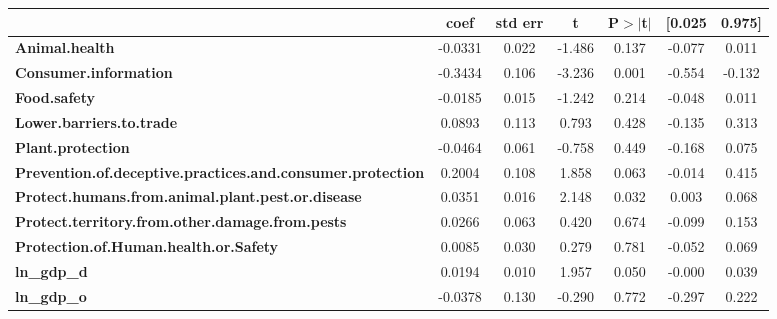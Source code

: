 \begin{center}
\begin{tabular}{lcccccc}
                                                                   & \textbf{coef} & \textbf{std err} & \textbf{t} & \textbf{P$> |$t$|$} & \textbf{[0.025} & \textbf{0.975]}  \\
\midrule
\textbf{Animal.health}                                             &      -0.0331  &        0.022     &    -1.486  &         0.137        &       -0.077    &        0.011     \\
\textbf{Consumer.information}                                      &      -0.3434  &        0.106     &    -3.236  &         0.001        &       -0.554    &       -0.132     \\
\textbf{Food.safety}                                               &      -0.0185  &        0.015     &    -1.242  &         0.214        &       -0.048    &        0.011     \\
\textbf{Lower.barriers.to.trade}                                   &       0.0893  &        0.113     &     0.793  &         0.428        &       -0.135    &        0.313     \\
\textbf{Plant.protection}                                          &      -0.0464  &        0.061     &    -0.758  &         0.449        &       -0.168    &        0.075     \\
\textbf{Prevention.of.deceptive.practices.and.consumer.protection} &       0.2004  &        0.108     &     1.858  &         0.063        &       -0.014    &        0.415     \\
\textbf{Protect.humans.from.animal.plant.pest.or.disease}          &       0.0351  &        0.016     &     2.148  &         0.032        &        0.003    &        0.068     \\
\textbf{Protect.territory.from.other.damage.from.pests}            &       0.0266  &        0.063     &     0.420  &         0.674        &       -0.099    &        0.153     \\
\textbf{Protection.of.Human.health.or.Safety}                      &       0.0085  &        0.030     &     0.279  &         0.781        &       -0.052    &        0.069     \\
\textbf{ln\_gdp\_d}                                                &       0.0194  &        0.010     &     1.957  &         0.050        &       -0.000    &        0.039     \\
\textbf{ln\_gdp\_o}                                                &      -0.0378  &        0.130     &    -0.290  &         0.772        &       -0.297    &        0.222     \\

\end{tabular}
\end{center}
